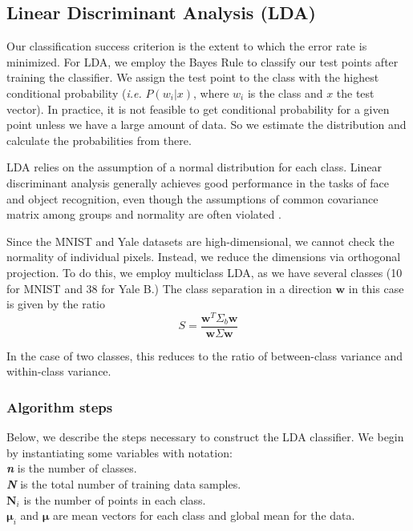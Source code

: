 \subsection{Linear Discriminant Analysis (LDA)}

Our classification success criterion is the extent to which the error rate is minimized. For LDA, we employ the Bayes Rule to classify our test points after training the classifier. We assign the test point to the class with the highest conditional probability (\textit{i.e.} $P(w_i|x)$, where $w_i$ is the class and $x$ the test vector). In practice, it is not feasible to get conditional probability for a given point unless we have a large amount of data. So we estimate the distribution and calculate the probabilities from there. 

LDA relies on the assumption of a normal distribution for each class. Linear discriminant analysis generally achieves good performance in the tasks of face and object recognition, even though the assumptions of common covariance matrix among groups and normality are often violated \cite{Li2006}.

Since the MNIST and Yale datasets are high-dimensional, we cannot check the normality of individual pixels. Instead, we reduce the dimensions via orthogonal projection.
To do this, we employ multiclass LDA, as we have several classes (10 for MNIST and 38 for Yale B.) The class separation in a direction $\pmb w$ in this case is given by the ratio \cite{wiki:LDA}
%
\begin{equation}
  S = \frac{\pmb w^T \Sigma_b \pmb w}{\pmb w \Sigma \pmb w}  
\end{equation}

In the case of two classes, this reduces to the ratio of between-class variance and within-class variance.

\subsubsection{Algorithm steps}
Below, we describe the steps necessary to construct the LDA classifier. We begin by instantiating some variables with notation:\\
\textit{\textbf{n}} is the number of classes. \\ \textit{\textbf{N}} is the total number of training data samples. \\ $\pmb N_i$ is the number of points in each class. \\ $\pmb \mu_i$ and $\pmb \mu$ are mean vectors for each class and global mean for the data.

